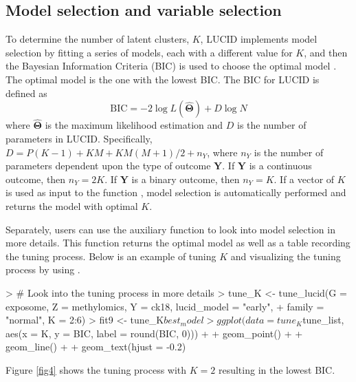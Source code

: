 \subsection{Model selection and variable selection} \label{sec3.3}
To determine the number of latent clusters, $K$, LUCID implements model selection by fitting a series of models, each with a different value for $K$, and then the Bayesian Information Criteria (BIC) is used to choose the optimal model \citep{fan2013tuning}. The optimal model is the one with the lowest BIC. The BIC for LUCID is defined as
\begin{equation}
    \text{BIC} = -2 \log L(\hat{\bm \Theta}) + D \log N
\end{equation}
where $\hat{\bm \Theta}$ is the maximum likelihood estimation and $D$ is the number of parameters in LUCID. Specifically, $D = P(K - 1) + KM + KM(M + 1)/2 + n_Y$, where $n_Y$ is the number of parameters dependent upon the type of outcome $\bm Y$. If $\bm Y$ is a continuous outcome, then $n_Y = 2K$. If $\bm Y$ is a binary outcome, then $n_Y = K$. If a vector of $K$ is used as input to the function , model selection is automatically performed and returns the model with optimal $K$.

Separately, users can use the auxiliary function  to look into model selection in more details. This function returns the optimal model as well as a table recording the tuning process. Below is an example of tuning $K$ and visualizing the tuning process by using .
\begin{example}
> # Look into the tuning process in more details
> tune_K <- tune_lucid(G = exposome, Z = methylomics, Y = ck18, lucid_model = "early", 
+                      family = "normal", K = 2:6)
> fit9 <- tune_K$best_model
> ggplot(data = tune_K$tune_list, aes(x = K, y = BIC, label = round(BIC, 0))) + 
+   geom_point() +
+   geom_line() + 
+   geom_text(hjust = -0.2)
\end{example}
Figure \ref{fig4} shows the tuning process with $K = 2$ resulting in the lowest BIC.

